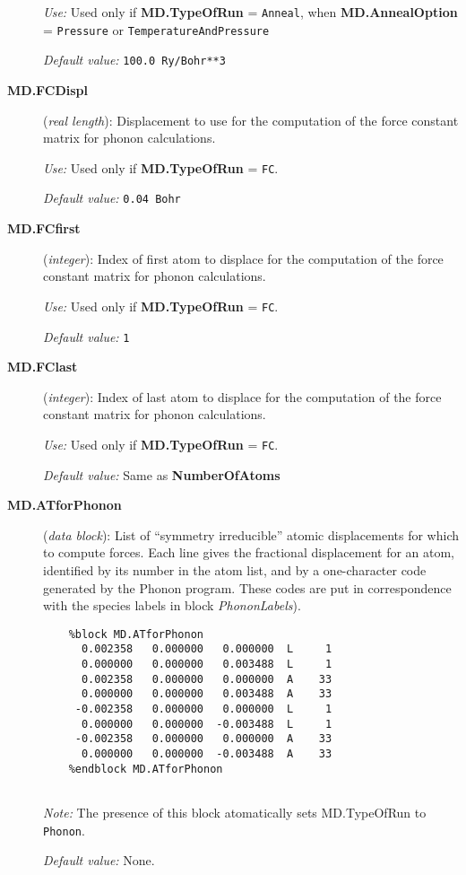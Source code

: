 \documentclass[11pt]{article}
\begin{document}
\begin{description}
{\it Use:} Used only if {\bf MD.TypeOfRun} = {\tt Anneal}, when
{\bf MD.AnnealOption} = {\tt Pressure} or {\tt TemperatureAndPressure}

{\it Default value:}  {\tt 100.0 Ry/Bohr**3}
        
\item[{\bf MD.FCDispl}] ({\it real length}): 
Displacement to use for the computation of the force constant
matrix for phonon calculations.

{\it Use:} Used only if {\bf MD.TypeOfRun} = {\tt FC}.

{\it Default value:}  {\tt 0.04 Bohr}

\item[{\bf MD.FCfirst}] ({\it integer}): 
Index of first atom to displace for the computation of the force constant
matrix for phonon calculations.

{\it Use:} Used only if {\bf MD.TypeOfRun} = {\tt FC}.

{\it Default value:}  {\tt 1}

\item[{\bf MD.FClast}] ({\it integer}): 
Index of last atom to displace for the computation of the force constant
matrix for phonon calculations.

{\it Use:} Used only if {\bf MD.TypeOfRun} = {\tt FC}.

{\it Default value:}  Same as {\bf NumberOfAtoms}

\item[{\bf MD.ATforPhonon}] ({\it data block}): List of ``symmetry
irreducible'' atomic displacements for which to compute forces. Each
line gives the fractional displacement for an atom, identified by its
number in the atom list, and by a one-character code generated by the
{\sc Phonon} program. These codes are put in correspondence with the
species labels in block \hbox{\it PhononLabels}).

\begin{verbatim}
    %block MD.ATforPhonon
      0.002358   0.000000   0.000000  L     1
      0.000000   0.000000   0.003488  L     1
      0.002358   0.000000   0.000000  A    33
      0.000000   0.000000   0.003488  A    33
     -0.002358   0.000000   0.000000  L     1
      0.000000   0.000000  -0.003488  L     1
     -0.002358   0.000000   0.000000  A    33
      0.000000   0.000000  -0.003488  A    33
    %endblock MD.ATforPhonon
  
\end{verbatim}

{\it Note:} The presence of this block 
atomatically sets MD.TypeOfRun to {\tt Phonon}.
 
{\it Default value:} None.

\end{description}
\end{document}
